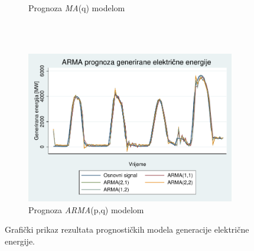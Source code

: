 \documentclass[a4paper,12pt,oneside]{memoir}
\begin{document}
\begin{figure}[H]
\begin{subfigure}[b] {0.50\linewidth}
                \caption{Prognoza \textit{MA}(q) modelom}      
                \label{fig:solar_graph_ma}
            \end{subfigure}
            \\~\\
            \begin{subfigure}[b] {0.50\linewidth}
                \centering
                \includegraphics[width=\textwidth]{graphs/solar_graph_arma.pdf}
                \caption{Prognoza \textit{ARMA}(p,q) modelom}      
                \label{fig:solar_graph_ma}
            \end{subfigure}
            \caption{Grafički prikaz rezultata prognostičkih modela generacije električne energije.}
            \label{fig:solar_models}    
        \end{figure}
\end{document}

